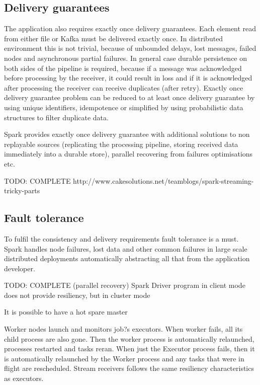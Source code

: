 \documentclass[a4paper, 10 pt, conference]{IEEEtran}
\begin{document}
\subsection{Delivery guarantees}
The application also requires exactly once delivery guarantees. Each element read from either file or Kafka must be delivered exactly once. In distributed environment this is not trivial, because of unbounded delays, lost messages, failed nodes and asynchronous partial failures. In general case durable persistence on both sides of the pipeline is required, because if a message was acknowledged before processing by the receiver, it could result in loss and if it is acknowledged after processing the receiver can receive duplicates (after retry). Exactly once delivery guarantee problem can be reduced to at least once delivery guarantee by using unique identifiers, idempotence or simplified by using probabilistic data structures to filter duplicate data.

Spark provides exactly once delivery guarantee with additional solutions to non replayable sources (replicating the processing pipeline, storing received data immediately into a durable store), parallel recovering from failures optimisations etc.

TODO: COMPLETE http://www.cakesolutions.net/teamblogs/spark-streaming-tricky-parts

\subsection{Fault tolerance}
To fulfil the consistency and delivery requirements fault tolerance is a must. Spark handles node failures, lost data and other common failures in large scale distributed deployments automatically abstracting all that from the application developer.

TODO: COMPLETE (parallel recovery)
Spark Driver program in client mode does not provide resiliency, but in cluster mode 

It is possible to have a hot spare master 

Worker nodes launch and monitors job?s executors. When worker fails, all its child process are also gone. Then the worker process is automatically relaunched, processes restarted and tasks reran. When just the Executor process fails, then it is automatically relaunched by the Worker process and any tasks that were in flight are rescheduled. Stream receivers follows the same resiliency characteristics as 
executors.
\end{document}

